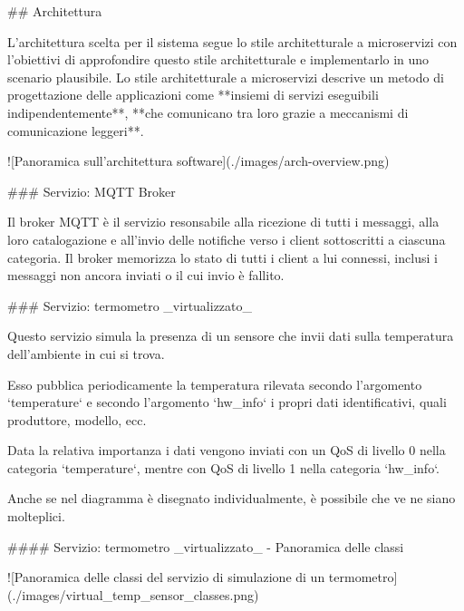 ## Architettura


L'architettura scelta per il sistema segue lo stile architetturale a microservizi con l'obiettivi di approfondire questo stile architetturale e implementarlo in uno scenario plausibile.
Lo stile architetturale a microservizi descrive un metodo di progettazione delle applicazioni come **insiemi di servizi eseguibili indipendentemente**, **che comunicano tra loro grazie a meccanismi di comunicazione leggeri**.

![Panoramica sull'architettura software](./images/arch-overview.png)

### Servizio: MQTT Broker

Il broker MQTT è il servizio resonsabile alla ricezione di tutti i messaggi, alla loro catalogazione e all'invio delle notifiche verso i client sottoscritti a ciascuna categoria.
Il broker memorizza lo stato di tutti i client a lui connessi, inclusi i messaggi non ancora inviati o il cui invio è fallito.

### Servizio: termometro _virtualizzato_

Questo servizio simula la presenza di un sensore che invii dati sulla temperatura dell'ambiente in cui si trova.

Esso pubblica periodicamente la temperatura rilevata secondo l'argomento `temperature` e secondo l'argomento `hw_info` i propri dati identificativi, quali produttore, modello, ecc.

Data la relativa importanza i dati vengono inviati con un QoS di livello 0 nella categoria `temperature`, mentre con QoS di livello 1 nella categoria `hw_info`.

Anche se nel diagramma è disegnato individualmente, è possibile che ve ne siano molteplici.

#### Servizio: termometro _virtualizzato_ - Panoramica delle classi

![Panoramica delle classi del servizio di simulazione di un  termometro](./images/virtual_temp_sensor_classes.png)

